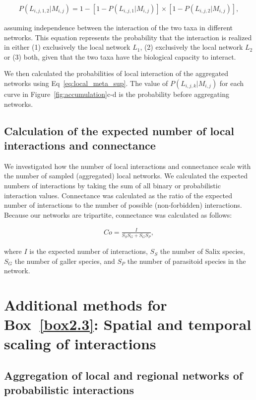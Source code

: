 \begin{refsection}
\begin{eqnarray}
    \label{eq:aggregate}
    P(L_{i, j, 1, 2}|M_{i, j}) = 1 - [1 - P(L_{i, j, 1}|M_{i, j})] \times [1 -
P(L_{i, j, 2}|M_{i, j})],
\end{eqnarray}

assuming independence between the interaction of the two taxa in different
networks. This equation represents the probability that the interaction is
realized in either (1) exclusively the local network $L_1$, (2) exclusively the
local network $L_2$ or (3) both, given that the two taxa have the biological
capacity to interact. 

We then calculated the probabilities of local interaction of the aggregated
networks using Eq~\ref{eq:local_meta_sup}. The value of $P(L_{i, j, k}|M_{i,
j})$ for each curve in Figure~\ref{fig:accumulation}c-d is the probability before
aggregating networks.  

\subsection{Calculation of the expected number of local interactions and connectance}

We investigated how the number of local interactions and connectance scale with
the number of sampled (aggregated) local networks. We calculated the expected
numbers of interactions by taking the sum of all binary or probabilistic
interaction values. Connectance was calculated as the ratio of the expected
number of interactions to the number of possible (non-forbidden) interactions.
Because our networks are tripartite, connectance was calculated as follows: 

\begin{eqnarray}
    \label{eq:co_tri}
    Co = \frac{I}{S_S S_G + S_G S_P},
\end{eqnarray}

where $I$ is the expected number of interactions, $S_S$ the number of Salix
species, $S_G$ the number of galler species, and $S_P$ the number of parasitoid
species in the network. 

\section{Additional methods for Box~\ref{box2.3}: Spatial and temporal scaling of interactions}

\subsection{Aggregation of local and regional networks of probabilistic interactions} 


\end{refsection}
